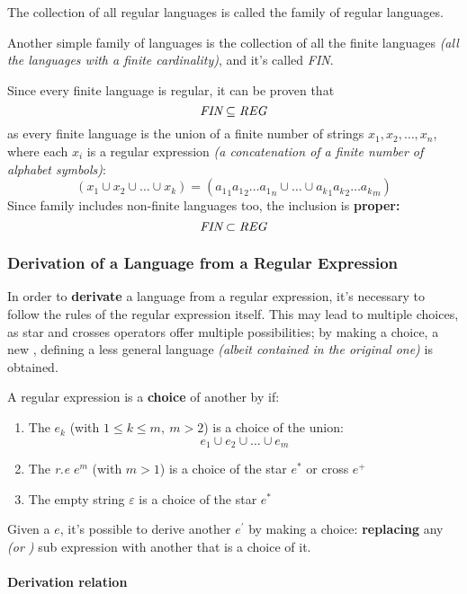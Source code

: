 \documentclass[english]{article}
\begin{document}
The collection of all regular languages is called the family \REG of regular languages.

Another simple family of languages is the collection of all the finite languages \textit{(all the languages with a finite cardinality)}, and it's called \textit{FIN}.

Since every finite language is regular, it can be proven that
\[ \textit{FIN} \subseteq \textit{REG} \]
as every finite language is the union of a finite number of strings \(x_1, x_2, \ldots, x_n\), where each \(x_i\) is a regular expression \textit{(a concatenation of a finite number of alphabet symbols)}:
\[ \left(x_1 \cup x_2 \cup \ldots \cup x_k \right) = \left({a_1}_1 {a_1}_2 \ldots {a_1}_n \cup \ldots \cup {a_k}_1 {a_k}_2 \ldots {a_k}_m \right) \]
Since family \REG includes non-finite languages too, the inclusion is \textbf{proper:}
\[ \textit{FIN} \subset \textit{REG} \]

\subsubsection{Derivation of a Language from a Regular Expression}

In order to \textbf{derivate} a language from a regular expression, it's necessary to follow the rules of the regular expression itself.
This may lead to multiple choices, as star and crosses operators offer multiple possibilities;
by making a choice, a new \re, defining a less general language \textit{(albeit contained in the original one)} is obtained.

A regular expression is a \textbf{choice} of another by if:

\begin{enumerate}
  \item The \re \(e_k\) (with \(1 \leq k \leq m, \ m > 2\)) is a choice of the union: \[ e_1 \cup e_2 \cup \ldots \cup e_m \]
  \item The \textit{r.e} \(e^m\) (with \(m > 1\)) is a choice of the star \(e^\ast\) or cross \(e^+\)
  \item The empty string \(\varepsilon\) is a choice of the star \(e^\ast\)
\end{enumerate}

Given a \re \(e\), it's possible to derive another \re \(e^\prime\) by making a choice:
\textbf{replacing} any  \textit{(or )} sub expression with another that is a choice of it.

\paragraph{Derivation relation}
\end{document}
